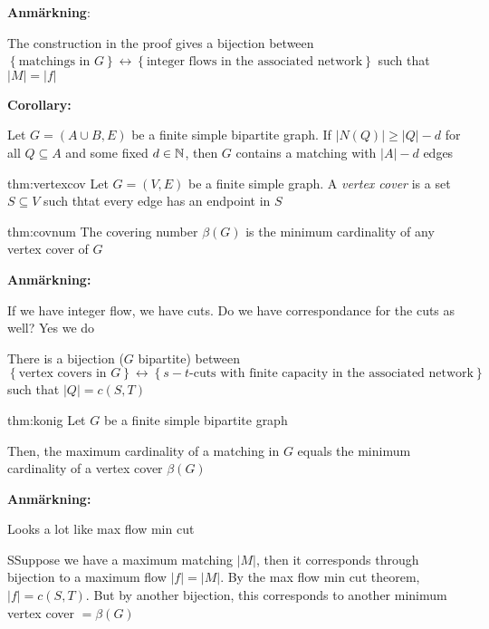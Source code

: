\par\bigskip
\noindent\textbf{Anmärkning}:\par
\noindent The construction in the proof gives a bijection between $\left\{\text{matchings in $G$}\right\}\leftrightarrow\left\{\text{integer flows in the associated network}\right\}$ such that $\left|M\right| = \left|f\right|$
\par\bigskip
\noindent\textbf{Corollary:}\par
\noindent Let $G = (A\cup B, E)$ be a finite simple bipartite graph. If $\left|N(Q)\right|\geq \left|Q\right|-d$ for all $Q\subseteq A$ and some fixed $d\in\mathbb{N}$, then $G$ contains a matching with $\left|A\right|-d$ edges 
\par\bigskip
\begin{theo}{thm:vertexcov}
  Let $G = (V,E)$ be a finite simple graph. A \textit{vertex cover} is a set $S\subseteq V$ such thtat every edge has an endpoint in $S$ 
\end{theo}
\par\bigskip
\begin{theo}{thm:covnum}
  The covering number $\beta(G)$ is the minimum cardinality of any vertex cover of $G$
\end{theo}
\par\bigskip
\noindent\textbf{Anmärkning:}\par
\noindent If we have integer flow, we have cuts. Do we have correspondance for the cuts as well? Yes we do 
\par\bigskip
\noindent There is a bijection ($G$ bipartite) between $\left\{\text{vertex covers in $G$}\right\}\leftrightarrow\left\{\text{$s-t$-cuts with finite capacity in the associated network}\right\}$ such that $\left|Q\right| = c(S,T)$
\par\bigskip
\begin{theo}[König]{thm:konig}
  Let $G$ be a finite simple bipartite graph
  \par\bigskip
  \noindent Then, the maximum cardinality of a matching in $G$ equals the minimum cardinality of a vertex cover $\beta(G)$
\end{theo}
\par\bigskip
\noindent\textbf{Anmärkning:}\par
\noindent Looks a lot like max flow min cut
\par\bigskip
\begin{prf}
  SSuppose we have a maximum matching $\left|M\right|$, then it corresponds through bijection to a maximum flow $\left|f\right| = \left|M\right|$. By the max flow min cut theorem, $\left|f\right| = c(S,T)$. But by another bijection, this corresponds to another minimum vertex cover $= \beta(G)$ 
\end{prf}
